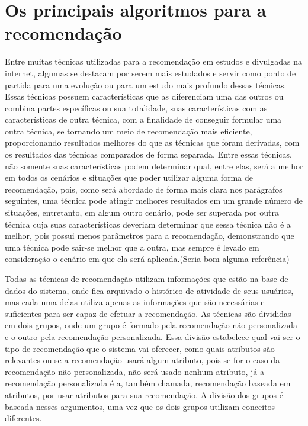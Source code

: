\documentclass[12pt,
				openright,
				twoside,
				a4paper,
				apter=TITLE,
				section=TITLE,
				subsection=TITLE,
				chapter=TITLE,
				english,
				brazil]{abntex2}
\begin{document}
\section{Os principais algoritmos para a recomendação}
Entre muitas técnicas utilizadas para a recomendação em estudos e divulgadas na internet, algumas se destacam por serem mais estudados e servir como ponto de partida para uma evolução ou para um estudo mais profundo dessas técnicas. Essas técnicas possuem características que as diferenciam uma das outros ou combina partes específicas ou sua totalidade, suas características com as características de outra técnica, com a finalidade de conseguir formular uma outra técnica, se tornando um meio de recomendação mais eficiente, proporcionando resultados melhores do que as técnicas que foram derivadas, com os resultados das técnicas comparados de forma separada. Entre essas técnicas, não somente suas características podem determinar qual, entre elas, será a melhor em todos os cenários e situações que poder utilizar alguma forma de recomendação, pois, como será abordado de forma mais clara nos parágrafos seguintes, uma técnica pode atingir melhores resultados em um grande número de situações, entretanto, em algum outro cenário, pode ser superada por outra técnica cuja suas características deveriam determinar que sessa técnica não é a melhor, pois possui menos parâmetros para a recomendação, demonstrando que uma técnica pode sair-se melhor que a outra, mas sempre é levado em consideração o cenário em que ela será aplicada.(Seria bom alguma referência)

Todas as técnicas de recomendação utilizam informações que estão na base de dados do sistema, onde fica arquivado o histórico de atividade de seus usuários, mas cada uma delas utiliza apenas as informações que são necessárias  e suficientes para ser capaz de efetuar a recomendação. As técnicas são divididas em dois grupos, onde um grupo é formado pela recomendação não personalizada e o outro pela recomendação personalizada\cite{schafer1999recommender}\cite{kantor2011recommender}. Essa divisão estabelece qual vai ser o tipo de recomendação que o sistema vai oferecer, como quais atributos são relevantes ou se a recomendação usará algum atributo, pois se for o caso da recomendação não personalizada, não será usado nenhum atributo, já a recomendação personalizada é a, também chamada, recomendação baseada em atributos\cite{schafer1999recommender}, por usar atributos para sua recomendação. A divisão dos grupos é baseada nesses argumentos, uma vez que os dois grupos utilizam conceitos diferentes.
\end{document}
